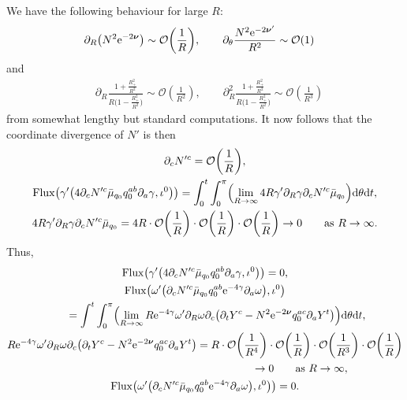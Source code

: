 \documentclass[pdftex]{sigma}
\def\ptl{\partial}%
\def\mbo#1{\boldsymbol{#1}}%
\numberwithin{equation}{section}
\begin{document}
We have the following behaviour for large $R$:
\begin{align*}
& \ptl_R \bigl(N^2 {\rm e}^{-2 \mbo{\nu}}\bigr) \sim \mathcal{O}\biggl(\frac{1}{R}\biggr),
\qquad \ptl_\theta \frac{N^2 {\rm e}^{-2 \mbo{\nu}'}}{R^2} \sim \mathcal{O} (1)
\end{align*}
and
\begin{align*}
& \ptl_R \frac{ 1 + \frac{R^2_+}{R^2}}{ R \bigl(1- \frac{R^2_+}{R^2}\bigr)} \sim \mathcal{O} (\frac{1}{R^2}), \qquad \ptl^2_R \frac{ 1 + \frac{R^2_+}{R^2}}{ R \bigl(1- \frac{R^2_+}{R^2}\bigr)} \sim \mathcal{O} (\frac{1}{R^3})
\end{align*}
from somewhat lengthy but standard computations. It now follows that the coordinate divergence of $N'$ is then
\begin{gather*}
\ptl_c N'^c = \mathcal{O} \biggl(\frac{1}{R}\biggr),
\\
{\rm Flux} \bigl(\gamma' \bigl(4 \ptl_c N'^c \bar{\mu}_{q_0} q^{ab} _0 \ptl_a \gamma, \iota^0\bigr)\bigr) =
\int^t_0 \int^\pi_0 \Bigl(\lim_{R \to \infty} 4 R \gamma' \ptl_R \gamma \ptl_c N'^c \bar{\mu}_{q_0}\Bigr) {\rm d} \theta {\rm d}t,
\\
4 R \gamma' \ptl_R \gamma \ptl_c N'^c \bar{\mu}_{q_0} = 4 R \cdot \mathcal{O} \biggl(\frac{1}{R}\biggr) \cdot \mathcal{O} \biggl(\frac{1}{R}\biggr) \cdot \mathcal{O} \biggl(\frac{1}{R}\biggr)
 \to 0 \qquad \text{as} \ R \to \infty.
\end{gather*}
Thus,
\begin{gather*}
{\rm Flux} \bigl(\gamma' \bigl(4 \ptl_c N'^c \bar{\mu}_{q_0} q^{ab} _0 \ptl_a \gamma, \iota^0\bigr)\bigr) =0,
\\
{\rm Flux} \bigl(\omega' \bigl(\ptl_c N'^c \bar{\mu}_{q_0} q^{ab} _0 {\rm e}^{-4 \gamma} \ptl_a \omega\bigr), \iota^0\bigr) \notag\\
 \qquad{} = \int^t \int^\pi_0 \Bigl(\lim_{R \to \infty} R {\rm e}^{-4\gamma} \omega' \ptl_R \omega \ptl_c\bigl(\ptl_t Y^c - N^2 {\rm e}^{-2 \mbo{\nu}} q^{ac}_0 \ptl_a Y^t\bigr)\Bigr) {\rm d} \theta {\rm d}t,
\\
R {\rm e}^{-4\gamma} \omega' \ptl_R \omega \ptl_c\bigl(\ptl_t Y^c - N^2 {\rm e}^{-2 \mbo{\nu}} q^{ac}_0 \ptl_a Y^t\bigr) = R \cdot \mathcal{O} \biggl(\frac{1}{R^4}\biggr) \cdot \mathcal{O} \biggl(\frac{1}{R}\biggr) \cdot \mathcal{O} \biggl(\frac{1}{R^3}\biggr) \cdot \mathcal{O} \biggl(\frac{1}{R}\biggr) \notag\\
\hphantom{R {\rm e}^{-4\gamma} \omega' \ptl_R \omega \ptl_c\bigl(\ptl_t Y^c - N^2 {\rm e}^{-2 \mbo{\nu}} q^{ac}_0 \ptl_a Y^t\bigr)}{}
\to 0 \qquad \text{as} \ R \to \infty,
\\
{\rm Flux} \bigl(\omega' \bigl(\ptl_c N'^c \bar{\mu}_{q_0} q^{ab} _0 {\rm e}^{-4 \gamma} \ptl_a \omega\bigr), \iota^0\bigr)\bigr) =0.
\end{gather*}
\end{document}
